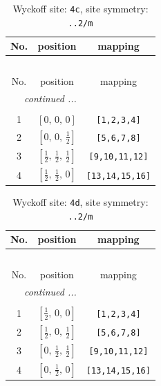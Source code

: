 \documentclass[fleqn,8pt]{jsarticle}
\begin{document}
\renewcommand{\arraystretch}{1.2}
\begin{longtable}{ccc}
\caption{Wyckoff site: {\tt 4c}, site symmetry: {\tt ..2/m}}
 \\
 \hline \hline
No. & position & mapping \\ \hline \endfirsthead

\multicolumn{2}{l}{\tablename\ \thetable{}} \\
 \hline \hline
No. & position & mapping \\ \hline \endhead

 \hline \hline
\multicolumn{2}{r}{\footnotesize\it continued ...} \\ \endfoot

 \hline \hline
\multicolumn{2}{r}{} \\ \endlastfoot

1 & $\left[ 0,\, 0,\, 0 \right]$ & {\tt [1,2,3,4]} \\ \hline
2 & $\left[ 0,\, 0,\, \frac{1}{2} \right]$ & {\tt [5,6,7,8]} \\ \hline
3 & $\left[ \frac{1}{2},\, \frac{1}{2},\, \frac{1}{2} \right]$ & {\tt [9,10,11,12]} \\ \hline
4 & $\left[ \frac{1}{2},\, \frac{1}{2},\, 0 \right]$ & {\tt [13,14,15,16]} \\
\end{longtable}
\renewcommand{\arraystretch}{1.2}
\begin{longtable}{ccc}
\caption{Wyckoff site: {\tt 4d}, site symmetry: {\tt ..2/m}}
 \\
 \hline \hline
No. & position & mapping \\ \hline \endfirsthead

\multicolumn{2}{l}{\tablename\ \thetable{}} \\
 \hline \hline
No. & position & mapping \\ \hline \endhead

 \hline \hline
\multicolumn{2}{r}{\footnotesize\it continued ...} \\ \endfoot

 \hline \hline
\multicolumn{2}{r}{} \\ \endlastfoot

1 & $\left[ \frac{1}{2},\, 0,\, 0 \right]$ & {\tt [1,2,3,4]} \\ \hline
2 & $\left[ \frac{1}{2},\, 0,\, \frac{1}{2} \right]$ & {\tt [5,6,7,8]} \\ \hline
3 & $\left[ 0,\, \frac{1}{2},\, \frac{1}{2} \right]$ & {\tt [9,10,11,12]} \\ \hline
4 & $\left[ 0,\, \frac{1}{2},\, 0 \right]$ & {\tt [13,14,15,16]} \\
\end{longtable}
\end{document}
